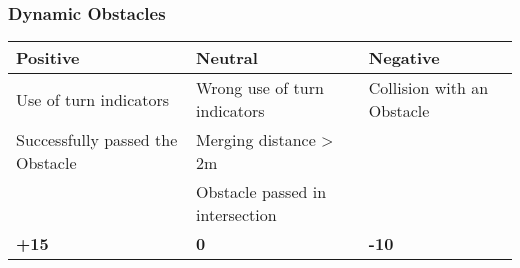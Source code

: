 {	\subsubsection*{Dynamic Obstacles}
	\begin{table}[H]
		\begin{tabularx}{\textwidth}{XXX}
			\toprule
			\textbf{Positive}                & \textbf{Neutral}                & \textbf{Negative}          \\
			\midrule
			Use of turn indicators           & Wrong use of turn indicators    & Collision with an Obstacle \\
			Successfully passed the Obstacle & Merging distance > 2m           &                            \\
			                                 & Obstacle passed in intersection &                            \\
			\topstrut
			\textbf{+15}                     & \textbf{0}                      & \textbf{-10}               \\
			\bottomrule
		\end{tabularx}
	\end{table}

}
